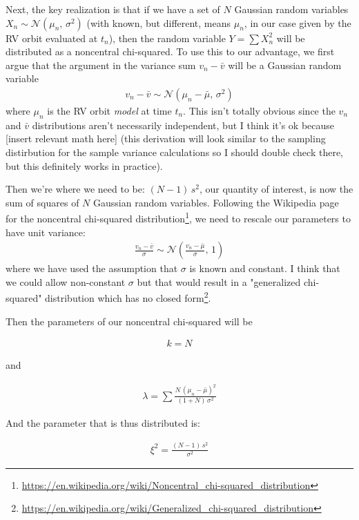 \documentclass[modern, letterpaper]{aastex631}
\begin{document}
Next, the key realization is that if we have a set of $N$ Gaussian random variables $X_n \sim \mathcal{N}\left(\mu_n,\,\sigma^2\right)$ (with known, but different, means $\mu_n$, in our case given by the RV orbit evaluated at $t_n$), then the random variable $Y = \sum X_n^2$ will be distributed as a noncentral chi-squared.
To use this to our advantage, we first argue that the argument in the variance sum $v_n - \bar{v}$ will be a Gaussian random variable
\begin{eqnarray}
	v_n - \bar{v} \sim \mathcal{N}\left(\mu_n - \bar{\mu},\,\sigma^2\right)
\end{eqnarray}
where $\mu_n$ is the RV orbit \emph{model} at time $t_n$.
This isn't totally obvious since the $v_n$ and $\bar{v}$ distributions aren't necessarily independent, but I think it's ok because [insert relevant math here] (this derivation will look similar to the sampling distirbution for the sample variance calculations so I should double check there, but this definitely works in practice).

Then we're where we need to be: $(N - 1)\,s^2$, our quantity of interest, is now the sum of squares of $N$ Gaussian random variables.
Following the Wikipedia page for the noncentral chi-squared distribution\footnote{\url{https://en.wikipedia.org/wiki/Noncentral_chi-squared_distribution}}, we need to rescale our parameters to have unit variance:
\begin{eqnarray}
	\frac{v_n - \bar{v}}{\sigma} \sim \mathcal{N}\left(\frac{v_n - \bar{\mu}}{\sigma},\,1\right)
\end{eqnarray}
where we have used the assumption that $\sigma$ is known and constant.
I think that we could allow non-constant $\sigma$ but that would result in a "generalized chi-squared" distribution which has no closed form\footnote{\url{https://en.wikipedia.org/wiki/Generalized_chi-squared_distribution}}.

Then the parameters of our noncentral chi-squared will be

\begin{eqnarray}
	k = N
\end{eqnarray}

and

\begin{eqnarray}
	\lambda = \sum \frac{N\,(\mu_n - \bar{\mu})^2}{(1 + N)\,\sigma^2}
\end{eqnarray}

And the parameter that is thus distributed is:

\begin{eqnarray}
	\xi^2 = \frac{(N - 1)\,s^2}{\sigma^2}
\end{eqnarray}
\end{document}
